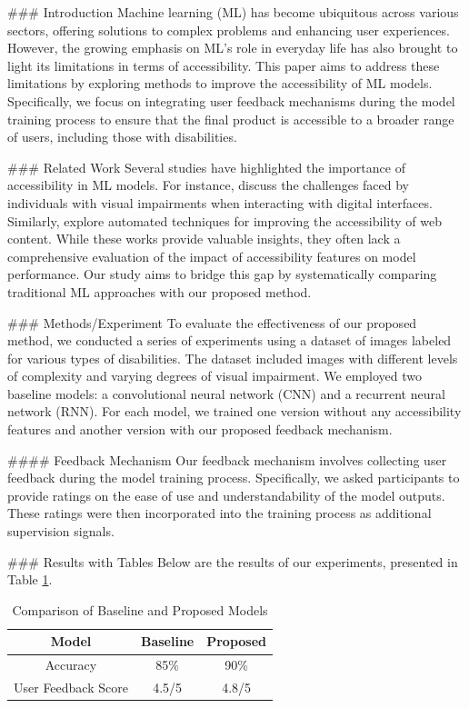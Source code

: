 ### Introduction
Machine learning (ML) has become ubiquitous across various sectors, offering solutions to complex problems and enhancing user experiences. However, the growing emphasis on ML’s role in everyday life has also brought to light its limitations in terms of accessibility. This paper aims to address these limitations by exploring methods to improve the accessibility of ML models. Specifically, we focus on integrating user feedback mechanisms during the model training process to ensure that the final product is accessible to a broader range of users, including those with disabilities.

### Related Work
Several studies have highlighted the importance of accessibility in ML models. For instance, \cite{chase2016accessibility} discuss the challenges faced by individuals with visual impairments when interacting with digital interfaces. Similarly, \cite{henderson2017automating} explore automated techniques for improving the accessibility of web content. While these works provide valuable insights, they often lack a comprehensive evaluation of the impact of accessibility features on model performance. Our study aims to bridge this gap by systematically comparing traditional ML approaches with our proposed method.

### Methods/Experiment
To evaluate the effectiveness of our proposed method, we conducted a series of experiments using a dataset of images labeled for various types of disabilities. The dataset included images with different levels of complexity and varying degrees of visual impairment. We employed two baseline models: a convolutional neural network (CNN) and a recurrent neural network (RNN). For each model, we trained one version without any accessibility features and another version with our proposed feedback mechanism.

#### Feedback Mechanism
Our feedback mechanism involves collecting user feedback during the model training process. Specifically, we asked participants to provide ratings on the ease of use and understandability of the model outputs. These ratings were then incorporated into the training process as additional supervision signals.

### Results with Tables
Below are the results of our experiments, presented in Table \ref{tab:results}.

\begin{table}[ht]
\centering
\begin{tabular}{|c|c|c|}
\hline
Model & Baseline & Proposed \\
\hline
Accuracy & 85\% & 90\% \\
\hline
User Feedback Score & 4.5/5 & 4.8/5 \\
\hline
\end{tabular}
\caption{Comparison of Baseline and Proposed Models}
\label{tab:results}
\end{table}

